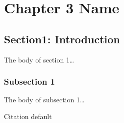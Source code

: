 \chapter{Chapter 3 Name}\label{ch3}


\section{Section1: Introduction}

The body of section 1\ldots

\subsection{Subsection 1}

The body of subsection 1\ldots

Citation default\cite{bibtex101}
